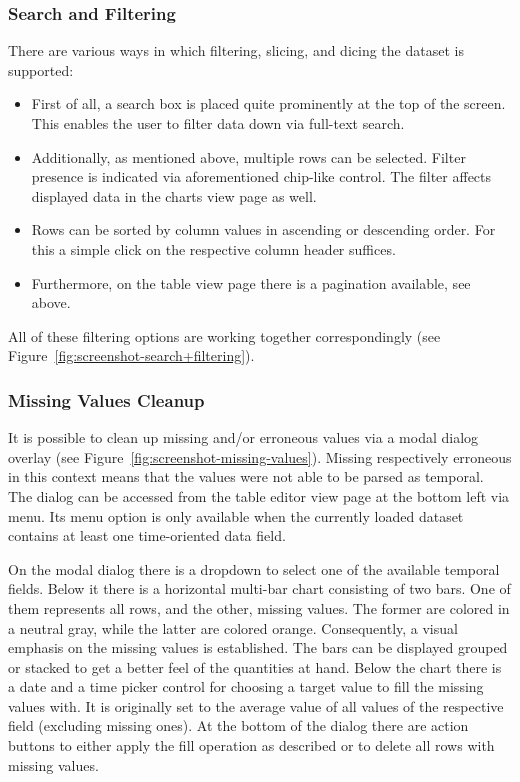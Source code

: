 \subsubsection{Search and Filtering}

There are various ways in which filtering, slicing, and dicing the dataset is supported:

\begin{itemize}
  \item First of all, a search box is placed quite prominently at the top of the screen.
This enables the user to filter data down via full-text search.
  \item Additionally, as mentioned above, multiple rows can be selected.
Filter presence is indicated via aforementioned chip-like control.
The filter affects displayed data in the charts view page as well.
  \item Rows can be sorted by column values in ascending or descending order.
For this a simple click on the respective column header suffices.
  \item Furthermore, on the table view page there is a pagination available, see above.
\end{itemize}

All of these filtering options are working together correspondingly (see Figure~\ref{fig:screenshot-search+filtering}).

\subsubsection{Missing Values Cleanup}

It is possible to clean up missing and/or erroneous values via a modal dialog overlay (see Figure~\ref{fig:screenshot-missing-values}).
Missing respectively erroneous in this context means that the values were not able to be parsed as temporal.
The dialog can be accessed from the table editor view page at the bottom left via menu.
Its menu option is only available when the currently loaded dataset contains at least one time-oriented data field.

On the modal dialog there is a dropdown to select one of the available temporal fields.
Below it there is a horizontal multi-bar chart consisting of two bars.
One of them represents all rows, and the other, missing values.
The former are colored in a neutral gray, while the latter are colored orange.
Consequently, a visual emphasis on the missing values is established.
The bars can be displayed grouped or stacked to get a better feel of the quantities at hand.
Below the chart there is a date and a time picker control for choosing a target value to fill the missing values with.
It is originally set to the average value of all values of the respective field (excluding missing ones).
At the bottom of the dialog there are action buttons to either apply the fill operation as described or to delete all rows with missing values.


